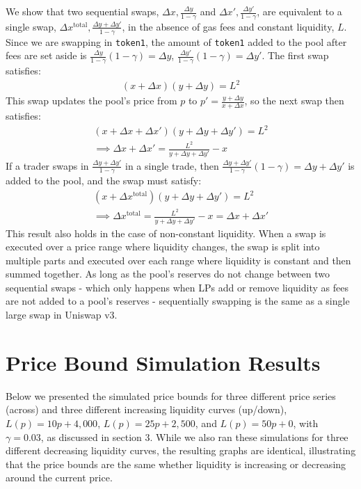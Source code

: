 \documentclass[11pt]{article}
\begin{document}
\begin{appendices}
We show that two sequential swaps, $\Delta x, \frac{\Delta y}{1 - \gamma}$ and $\Delta x', \frac{\Delta y'}{1 - \gamma}$, are equivalent to a single swap, $\Delta x^{\text{total}}, \frac{\Delta y + \Delta y'}{1 - \gamma}$, in the absence of gas fees and constant liquidity, $L$. Since we are swapping in \texttt{token1}, the amount of \texttt{token1} added to the pool after fees are set aside is $\frac{\Delta y}{1 - \gamma} (1 - \gamma) = \Delta y$, $\frac{\Delta y'}{1 - \gamma} (1 - \gamma) = \Delta y'$. The first swap satisfies:
\begin{gather*}
    (x + \Delta x)(y + \Delta y) = L^2
\end{gather*}
This swap updates the pool's price from $p$ to $p' = \frac{y + \Delta y}{x + \Delta x}$, so the next swap then satisfies:
\begin{gather*}
    (x + \Delta x + \Delta x')(y + \Delta y + \Delta y') = L^2 \\
    \implies \Delta x + \Delta x' = \frac{L^2}{y + \Delta y + \Delta y'} - x
\end{gather*}
If a trader swaps in $\frac{\Delta y + \Delta y'}{1 - \gamma}$ in a single trade, then $\frac{\Delta y + \Delta y'}{1 - \gamma} (1 - \gamma) = \Delta y + \Delta y'$ is added to the pool, and the swap must satisfy:
\begin{gather*}
    (x + \Delta x^{\text{total}})(y + \Delta y + \Delta y') = L^2 \\
    \implies \Delta x^{\text{total}} = \frac{L^2}{y + \Delta y + \Delta y'} - x = \Delta x + \Delta x'
\end{gather*}
This result also holds in the case of non-constant liquidity. When a swap is executed over a price range where liquidity changes, the swap is split into multiple parts and executed over each range where liquidity is constant and then summed together. As long as the pool's reserves do not change between two sequential swaps - which only happens when LPs add or remove liquidity as fees are not added to a pool's reserves - sequentially swapping is the same as a single large swap in Uniswap v3.

\section{Price Bound Simulation Results}\label{sec:9}
Below we presented the simulated price bounds for three different price series (across) and three different increasing liquidity curves (up/down), $L(p) = 10p + 4,000$, $L(p) = 25p + 2,500$, and $L(p) = 50p + 0$, with $\gamma = 0.03$, as discussed in section 3. While we also ran these simulations for three different decreasing liquidity curves, the resulting graphs are identical, illustrating that the price bounds are the same whether liquidity is increasing or decreasing around the current price.


\end{appendices}
\end{document}
